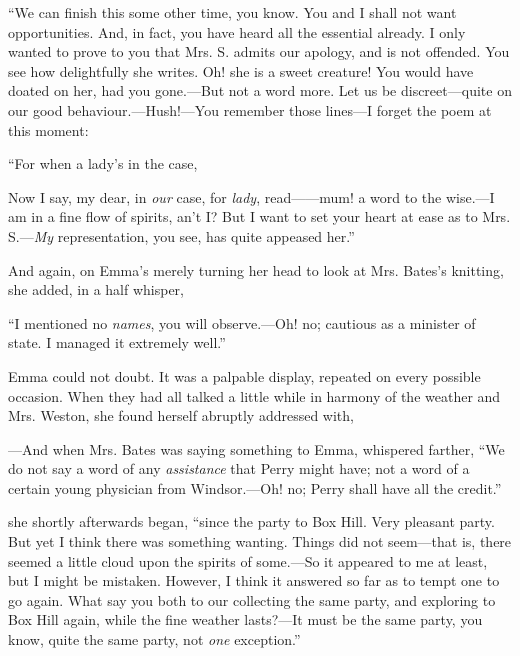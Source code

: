 “We can finish this some other time, you know. You and I shall not want opportunities. And, in fact, you have heard all the essential already. I only wanted to prove to you that Mrs. S. admits our apology, and is not offended. You see how delightfully she writes. Oh! she is a sweet creature! You would have doated on her, had you gone.---But not a word more. Let us be discreet---quite on our good behaviour.---Hush!---You remember those lines---I forget the poem at this moment:

“For when a lady's in the case,\crlf
{}

Now I say, my dear, in {\em our} case, for {\em lady}, read------mum! a word to the wise.---I am in a fine flow of spirits, an't I? But I want to set your heart at ease as to Mrs. S.---{\em My} representation, you see, has quite appeased her.”

And again, on Emma's merely turning her head to look at Mrs. Bates's knitting, she added, in a half whisper,

“I mentioned no {\em names}, you will observe.---Oh! no; cautious as a minister of state. I managed it extremely well.”

Emma could not doubt. It was a palpable display, repeated on every possible occasion. When they had all talked a little while in harmony of the weather and Mrs. Weston, she found herself abruptly addressed with,

---And when Mrs. Bates was saying something to Emma, whispered farther, “We do not say a word of any {\em assistance} that Perry might have; not a word of a certain young physician from Windsor.---Oh! no; Perry shall have all the credit.”

 she shortly afterwards began, “since the party to Box Hill. Very pleasant party. But yet I think there was something wanting. Things did not seem---that is, there seemed a little cloud upon the spirits of some.---So it appeared to me at least, but I might be mistaken. However, I think it answered so far as to tempt one to go again. What say you both to our collecting the same party, and exploring to Box Hill again, while the fine weather lasts?---It must be the same party, you know, quite the same party, not {\em one} exception.”

